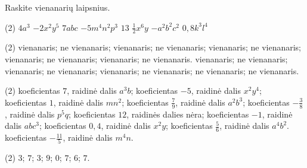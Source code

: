 \documentclass[11pt,a4paper]{scrartcl}
\begin{document}
\begin{problem}
Raskite vienanarių laipsnius.

\begin{tasks}[label={(\arabic*)}, label-offset=0.9em](2)
    \task $4a^3$
    \task $-2x^2y^5$
    \task $7abc$
    \task $-5m^4n^2p^3$
    \task $13$
    \task $\frac{1}{2}x^6y$
    \task $-a^2b^2c^2$
    \task $0,8k^3l^4$
\end{tasks}
\end{problem}

\newpage
\answerssection

\begin{problem} \phantom{text}
\begin{tasks}[label={(\arabic*)}, label-offset=0.9em](2)
    \task vienanaris;
    \task ne vienanaris;
    \task vienanaris;
    \task ne vienanaris;
    \task vienanaris;
    \task ne vienanaris;
    \task vienanaris;
    \task ne vienanaris;
    \task vienanaris;
    \task ne vienanaris.
    \task vienanaris;
    \task ne vienanaris;
    \task vienanaris;
    \task ne vienanaris;
    \task vienanaris;
    \task ne vienanaris;
    \task ne vienanaris;
    \task ne vienanaris.
\end{tasks}
\end{problem}

\begin{problem} \phantom{text}
    \begin{tasks}[label={(\arabic*)}, label-offset=0.9em](2)
    \task koeficientas $7$, raidinė dalis $a^3b$;
    \task koeficientas $-5$, raidinė dalis $x^2y^4$;
    \task koeficientas $1$, raidinė dalis $mn^2$;
    \task koeficientas $\frac{7}{9}$, raidinė dalis $a^2b^3$;
    \task koeficientas $-\frac{3}{8}$, raidinė dalis $p^5q$;
    \task koeficientas $12$, raidinės dalies nėra;
    \task koeficientas $-1$, raidinė dalis $abc^3$;
    \task koeficientas $0,4$, raidinė dalis $x^2y$;
    \task koeficientas $\frac{5}{6}$, raidinė dalis $a^4b^2$.
    \task koeficientas $-\frac{11}{5}$, raidinė dalis $m^4n$.
\end{tasks}
\end{problem}

\begin{problem} \phantom{text}
\begin{tasks}[label={(\arabic*)}, label-offset=0.9em](2)
    \task $3$;
    \task $7$;
    \task $3$;
    \task $9$;
    \task $0$;
    \task $7$;
    \task $6$;
    \task $7$.
\end{tasks}
\end{problem}
\end{document}
